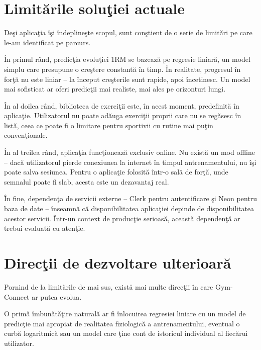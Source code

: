 \section{Limit\u arile solu\c tiei actuale}

De\c si aplica\c tia \^ i\c si \^ indepline\c ste scopul, sunt con\c stient
de o serie de limit\u ari pe care le-am identificat pe parcurs.

\^ In primul r\^ and, predic\c tia evolu\c tiei 1RM se bazeaz\u a pe
regresie liniar\u a, un model simplu care presupune o cre\c stere
constant\u a \^ in timp. \^ In realitate, progresul \^ in for\c t\u a
nu este liniar -- la \^ inceput cre\c sterile sunt rapide, apoi
\^ incetinesc. Un model mai sofisticat ar oferi predic\c tii mai
realiste, mai ales pe orizonturi lungi.

\^ In al doilea r\^ and, biblioteca de exerci\c tii este, \^ in acest
moment, predefinit\u a \^ in aplica\c tie. Utilizatorul nu poate ad\u auga
exerci\c tii proprii care nu se reg\u asesc \^ in list\u a, ceea ce
poate fi o limitare pentru sportivii cu rutine mai pu\c tin
conven\c tionale.

\^ In al treilea r\^ and, aplica\c tia func\c tioneaz\u a exclusiv online.
Nu exist\u a un mod offline -- dac\u a utilizatorul pierde conexiunea
la internet \^ in timpul antrenamentului, nu \^ i\c si poate salva
sesiunea. Pentru o aplica\c tie folosit\u a \^ intr-o sal\u a de for\c t\u a,
unde semnalul poate fi slab, acesta este un dezavantaj real.

\^ In fine, dependen\c ta de servicii externe -- Clerk pentru
autentificare \c si Neon pentru baza de date -- \^ inseamn\u a c\u a
disponibilitatea aplica\c tiei depinde de disponibilitatea acestor
servicii. \^ Intr-un context de produc\c tie serioas\u a, aceast\u a
dependen\c t\u a ar trebui evaluat\u a cu aten\c tie.

\section{Direc\c tii de dezvoltare ulterioar\u a}

Pornind de la limit\u arile de mai sus, exist\u a mai multe direc\c tii
\^ in care Gym-Connect ar putea evolua.

O prim\u a \^ imbun\u at\u a\c tire natural\u a ar fi \^ inlocuirea
regresiei liniare cu un model de predic\c tie mai apropiat de
realitatea fiziologic\u a a antrenamentului, eventual o curb\u a
logaritmic\u a sau un model care \c tine cont de istoricul individual
al fiec\u arui utilizator.


